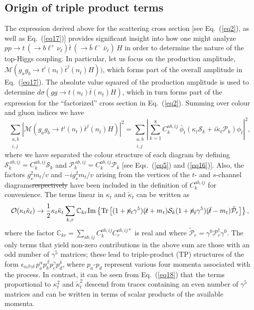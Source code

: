 \documentclass[aps,preprint,tightenlines,floatfix,superscriptaddress,nofootinbib,showpacs]{revtex4-1}
\def\beq{\begin{equation}}
\def\eeq{\end{equation}}
\def\tbslash{\tbar\hspace{-10pt}\not{}\hspace{4pt}}
\def\tslash{t\hspace{-10pt}\not{}\hspace{4pt}}
\def\nslash{n\hspace{-10pt}\not{}\hspace{4pt}}
\def\tbar{\bar{t}}
\def\bbar{\bar{b}}
\def\nubar{{\bar{\nu}}_{\ell}}
\def\ppprocess{pp\to t\,\left(\rightarrow b {\ell}^+ \nu_{\ell}\right) \tbar\,\left(\rightarrow\bbar {\ell}^-\nubar\right)\,H}
\def\kp{\kappa_t}
\def\kpt{\tilde{\kappa}_t}
\providecommand{\DIFadd}[1]{{\protect\color{blue}\uwave{#1}}} %
\providecommand{\DIFdel}[1]{{\protect\color{red}\sout{#1}}}                      %
\providecommand{\DIFaddbegin}{} %
\providecommand{\DIFaddend}{} %
\providecommand{\DIFdelbegin}{} %
\providecommand{\DIFdelend}{} %
\begin{document}
\setlength{\abovedisplayskip}{10.2pt}
\setlength{\belowdisplayskip}{10.2pt}

\subsection{Origin of triple product terms}
\label{subsec:origin}

The expression derived above for the scattering cross
section [see Eq.~(\ref{eq2}), as well as Eq.~(\ref{eq17})]
provides significant insight into
how one might analyze $\ppprocess$ in order to determine
the nature of the top-Higgs coupling.  In particular,
let us focus on the production amplitude,
$\mathcal{M}(g_ag_b \to t^i(n_t)\tbar^j(n_{\tbar})H))$, which forms
part of the overall amplitude in Eq.~(\ref{eq17}).
The absolute value squared of the production amplitude
is used to determine $d\sigma(gg\to t(n_t)\tbar (n_{\tbar})H)$,
which in turn forms part of the expression for the ``factorized'' cross section
in Eq.~(\ref{eq2}).  Summing over colour and gluon indices
we have
%
\beq
\label{eq18}
\sum_{\substack{a,b \\ i,j}}|\mathcal{M}(g_ag_b \to t^i(n_t)\tbar^j(n_{\tbar})H)|^2=\sum_{\substack{a,b \\ i,j}}\left|\sum^{8}_{k=1}C^{ab,ij}_k\,\bar{\phi}_t (\kp\mathcal{S}_k+i\kpt\mathcal{P}_k)\phi_{\tbar}\right|^2,
\eeq
%
where we have separated the colour structure of each diagram by defining
$\mathcal{S}^{\,ab,ij}_k= C^{ab,ij}_k \mathcal{S}_k$ and
$\mathcal{P}^{\,ab,ij}_k= C^{ab,ij}_k \mathcal{P}_k$
[see Eqs.~(\ref{eq5}) and (\ref{eq16})]. Also, the factors
$g^2_s m_t/v$ and $-ig^2_s m_t/v$ arising from the vertices of the $t$-
and $s$-channel diagrams\DIFdelbegin \DIFdel{respectively }\DIFdelend \DIFaddbegin \DIFadd{, respectively, }\DIFaddend have been included in the
definition of $C^{ab,ij}_k$ for convenience. The terms linear in $\kp$
and $\kpt$ can be written as
%
\beq
\label{eq19}
\mathcal{O}(\kp\kpt)\to \frac{1}{2}\kp\kpt \sum_{k,r}\mathbb{C}_{kr}\mathrm{Im}
\left\lbrace \mathrm{Tr}\left[ (1+\nslash_t \gamma^5)(\tslash+m_t)\mathcal{S}_k(1+\nslash_{\tbar}\gamma^5
 )(\tbslash -m_t)\tilde{\mathcal{P}}_r \right] \right\rbrace ,
\eeq
%
where the factor $\mathbb{C}_{kr}=\sum_{ab,ij}C^{ab,ij}_k
C^{ab,ij*}_r$ is real and where $\tilde{\mathcal{P}}_r = \gamma^0
\mathcal{P}^{\dagger}_r \gamma^0$.
The only terms that yield non-zero contributions
in the above sum are those with an
odd number of $\gamma^5$ matrices; these lead to triple-product
(TP) structures
of the form $\epsilon_{\alpha\beta\gamma\delta}\,p^{\alpha}_ap^{\beta}_bp^{\gamma}_cp^{\delta}_d$,
where $p_a$-$p_d$ represent various four momenta associated with the process.
In contrast,
it can be seen from Eq.~(\ref{eq18}) that the terms proportional to
$\kp^2$ and $\tilde{\kappa}^2_t$ descend from traces containing
an even number of $\gamma^5$
matrices and can be written in terms of scalar products of the
available momenta.\par
\end{document}
